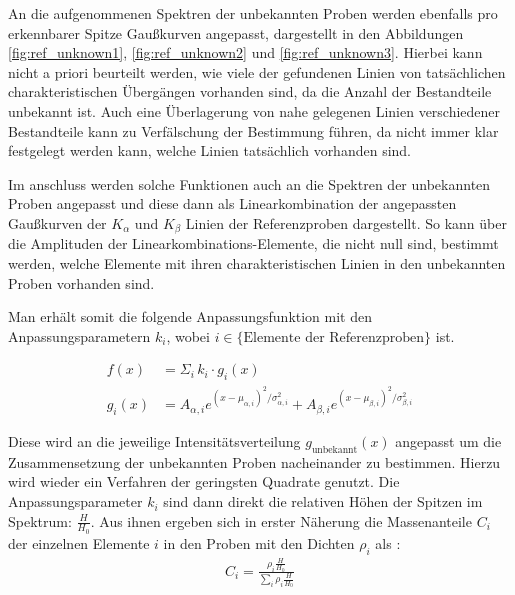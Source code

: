 An die aufgenommenen Spektren der unbekannten Proben werden ebenfalls pro erkennbarer Spitze Gaußkurven angepasst, dargestellt in den Abbildungen \ref{fig:ref_unknown1}, \ref{fig:ref_unknown2} und \ref{fig:ref_unknown3}.
Hierbei kann nicht a priori beurteilt werden, wie viele der gefundenen Linien von tatsächlichen charakteristischen Übergängen vorhanden sind, da die Anzahl der Bestandteile unbekannt ist. Auch eine Überlagerung von nahe gelegenen Linien verschiedener Bestandteile kann zu Verfälschung der Bestimmung führen, da nicht immer klar festgelegt werden kann, welche Linien tatsächlich vorhanden sind.


Im anschluss werden solche Funktionen auch an die Spektren der unbekannten Proben angepasst und diese dann als Linearkombination der angepassten Gaußkurven der $K_\alpha$ und $K_\beta$ Linien der Referenzproben dargestellt. So kann über die Amplituden der Linearkombinations-Elemente, die nicht null sind, bestimmt werden, welche Elemente mit ihren charakteristischen Linien in den unbekannten Proben vorhanden sind.

Man erhält somit die folgende Anpassungsfunktion mit den Anpassungsparametern $k_i$, wobei $i \in \{\text{Elemente der Referenzproben}\}$ ist.

\begin{align}
	f(x) &= \Sigma_i \, k_i \cdot g_i(x) \\
	g_i(x) &= A_{\alpha, i} e^{(x - \mu_{\alpha, i})^2 / \sigma_{\alpha, i}^2}
	+ A_{\beta, i} e^{(x - \mu_{\beta, i})^2 / \sigma_{\beta, i}^2}
\end{align}

Diese wird an die jeweilige Intensitätsverteilung $g_\text{unbekannt}(x)$ angepasst um die Zusammensetzung der unbekannten Proben nacheinander zu bestimmen. Hierzu wird wieder ein Verfahren der geringsten Quadrate genutzt. Die Anpassungsparameter $k_i$ sind dann direkt die relativen Höhen der Spitzen im Spektrum: $\frac{H}{H_0}$. Aus ihnen ergeben sich in erster Näherung die Massenanteile $C_i$ der einzelnen Elemente $i$ in den Proben mit den Dichten $\rho_i$ als \cite[7-8]{Versuchsanleitung428}:
\begin{align} \label{eq:massenanteile}
C_i = \frac{\rho_i \frac{H}{H_0}}{\sum_i \rho_i \frac{H}{H_0}}
\end{align}

